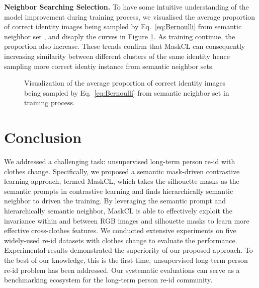 \documentclass[10pt,twocolumn,letterpaper]{article}
\newcommand{\reid}{re-id}
\newcommand{\myparagraph}[1]{\noindent\textbf{#1.}}
\begin{document}
{ 
\myparagraph{Neighbor Searching Selection}
To have some intuitive understanding of the model improvement during training process, 
we visualised the average proportion of correct identity images being sampled by Eq.~\eqref{eq:Bernoulli} from semantic neighbor set , and disaply the curves in Figure \ref{fig:benulisample}. 
As training continue, the proportion also increase. These trends confirm that MaskCL can consequently increasing similarity between different clusters of the same identity hence sampling more correct identiy instance from semantic neighbor sets.


    \begin{figure}[!htb]
        \begin{center}
        \footnotesize
        \end{center}
        \vspace{-6pt}
        \caption{ Visualization of the average proportion of correct identity images being sampled by Eq.~\eqref{eq:Bernoulli} from semantic neighbor set  in training process.}
        \label{fig:benulisample}
        \vspace{-10pt}
        \end{figure}   






\section{Conclusion}
\vspace{-5pt}


We addressed a challenging task: unsupervised long-term person \reid{} with clothes change. Specifically, we proposed a semantic mask-driven contrastive learning approach, termed MaskCL, which takes the silhouette masks as the semantic prompts in contrastive learning and finds hierarchically semantic neighbor to driven the training. 
By leveraging the semantic prompt and hierarchically semantic neighbor, MaskCL is able to effectively exploit the invariance within and between RGB images and silhouette masks to learn more effective cross-clothes features. We conducted extensive experiments on five widely-used
re-id datasets with clothes change to evaluate the performance. Experimental results demonstrated the superiority of our proposed approach. To the best of our knowledge, this is the first time, unsupervised long-term person \reid{} problem has been addressed. Our systematic evaluations can serve as a benchmarking ecosystem for the long-term person re-id community.










}
\end{document}
